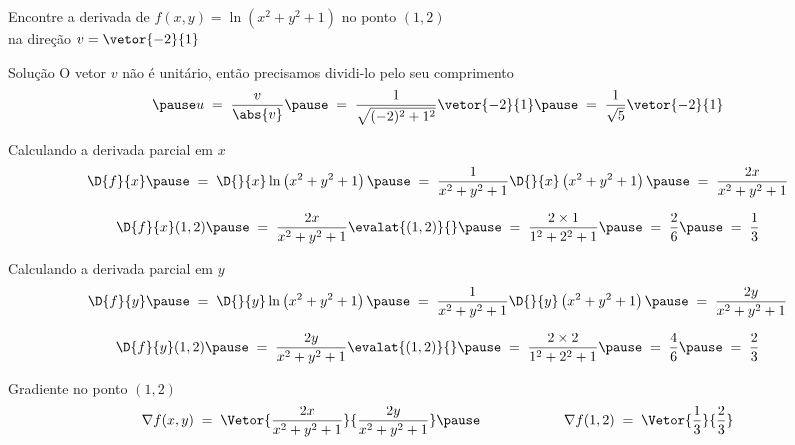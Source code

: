 \begin{question}
  Encontre a derivada de
  \(
    f(x, y) = \ln\left(x^2 + y^2 + 1\right)
  \)
  no ponto
  \(
    (1, 2)
  \) \\

  \smallskip
  na direção
  \(
    v = \vetor{-2}{1}
  \)
\end{question}

\begin{resolution}{Solução}
  O vetor $v$ não é unitário,
  \pause
  então precisamos dividi-lo pelo seu
  comprimento
  \[
    \pause
    u
    \;=\; \frac{v}{\abs{v}}
    \pause
    \;=\; \frac{1}{\sqrt{(-2)^2 + 1^2}} \vetor{-2}{1}
    \pause
    \;=\; \frac{1}{\sqrt{5}} \vetor{-2}{1}
  \]
\end{resolution}

\begin{resolution}{Calculando a derivada parcial em $x$}
  \[
    \D{f}{x}
    \pause
    \;=\; \D{}{x} \ln\left(x^2 + y^2 + 1\right)
    \pause
    \;=\; \frac{1}{x^2 + y^2 + 1} \D{}{x}\left(x^2 + y^2 + 1\right)
    \pause
    \;=\; \frac{2x}{x^2 + y^2 + 1}
  \]

  \pause
  \bigskip
  \[
    \D{f}{x}(1, 2)
    \pause
    \;=\; \frac{2x}{x^2 + y^2 + 1}\evalat{(1, 2)}{}
    \pause
    \;=\; \frac{2\times 1}{1^2 + 2^2 + 1}
    \pause
    \;=\; \frac{2}{6}
    \pause
    \;=\; \frac{1}{3}
  \]
\end{resolution}

\begin{resolution}{Calculando a derivada parcial em $y$}
  \[
    \D{f}{y}
    \pause
    \;=\; \D{}{y} \ln\left(x^2 + y^2 + 1\right)
    \pause
    \;=\; \frac{1}{x^2 + y^2 + 1} \D{}{y}\left(x^2 + y^2 + 1\right)
    \pause
    \;=\; \frac{2y}{x^2 + y^2 + 1}
  \]

  \pause
  \bigskip
  \[
    \D{f}{y}(1, 2)
    \pause
    \;=\; \frac{2y}{x^2 + y^2 + 1}\evalat{(1, 2)}{}
    \pause
    \;=\; \frac{2\times 2}{1^2 + 2^2 + 1}
    \pause
    \;=\; \frac{4}{6}
    \pause
    \;=\; \frac{2}{3}
  \]
\end{resolution}

\begin{resolution}{Gradiente no ponto $(1, 2)$}
  \[
    \nabla f(x, y)
    \;=\; \Vetor{\frac{2x}{x^2 + y^2 + 1}}{\frac{2y}{x^2 + y^2 + 1}}
    \pause
    \qquad\qquad\qquad
    \nabla f(1, 2)
    \;=\; \Vetor{\frac{1}{3}}{\frac{2}{3}}
  \]
\end{resolution}

